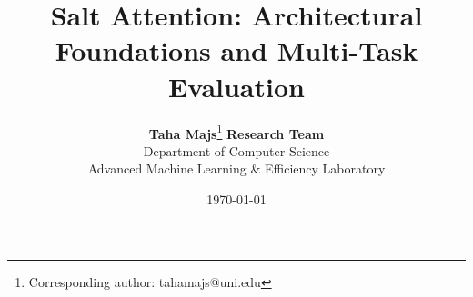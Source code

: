\title{\textbf{Salt Attention: Architectural Foundations and Multi-Task Evaluation}}

\author{
  \textbf{Taha Majs}\thanks{Corresponding author: tahamajs@uni.edu} \quad \textbf{Research Team} \\
  Department of Computer Science \\
  Advanced Machine Learning \& Efficiency Laboratory
}

\date{\today}
